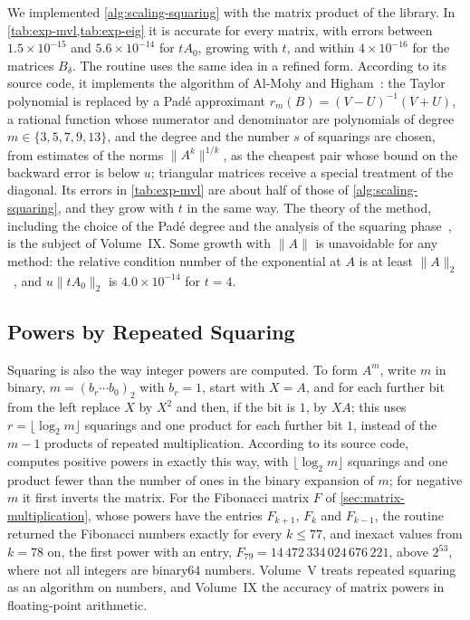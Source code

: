 We implemented \cref{alg:scaling-squaring} with the matrix product of the library. In \cref{tab:exp-mvl,tab:exp-eig} it is accurate for every matrix, with errors between $1.5\times10^{-15}$ and $5.6\times10^{-14}$ for $tA_0$, growing with $t$, and within $4\times10^{-16}$ for the matrices $B_\delta$. The routine  uses the same idea in a refined form. According to its source code, it implements the algorithm of Al-Mohy and Higham~\cite{almohy2009}: the Taylor polynomial is replaced by a Pad\'e approximant $r_m(B)=(V-U)^{-1}(V+U)$, a rational function whose numerator and denominator are polynomials of degree $m\in\{3,5,7,9,13\}$, and the degree and the number $s$ of squarings are chosen, from estimates of the norms $\|A^k\|^{1/k}$, as the cheapest pair whose bound on the backward error is below $u$; triangular matrices receive a special treatment of the diagonal. Its errors in \cref{tab:exp-mvl} are about half of those of \cref{alg:scaling-squaring}, and they grow with $t$ in the same way. The theory of the method, including the choice of the Pad\'e degree and the analysis of the squaring phase~\cite{higham2005}, is the subject of Volume~IX. Some growth with $\|A\|$ is unavoidable for any method: the relative condition number of the exponential at $A$ is at least $\|A\|_2$~\cite[Sect.~10.2]{higham2008}, and $u\|tA_0\|_2$ is $4.0\times10^{-14}$ for $t=4$.

\subsection{Powers by Repeated Squaring}

Squaring is also the way integer powers are computed. To form $A^m$, write $m$ in binary, $m=(b_r\cdots b_0)_2$ with $b_r=1$, start with $X=A$, and for each further bit from the left replace $X$ by $X^2$ and then, if the bit is $1$, by $XA$; this uses $r=\lfloor\log_2m\rfloor$ squarings and one product for each further bit $1$, instead of the $m-1$ products of repeated multiplication. According to its source code,  computes positive powers in exactly this way, with $\lfloor\log_2m\rfloor$ squarings and one product fewer than the number of ones in the binary expansion of $m$; for negative $m$ it first inverts the matrix. For the Fibonacci matrix $F$ of \cref{sec:matrix-multiplication}, whose powers have the entries $F_{k+1}$, $F_k$ and $F_{k-1}$, the routine returned the Fibonacci numbers exactly for every $k\le77$, and inexact values from $k=78$ on, the first power with an entry, $F_{79}=14\,472\,334\,024\,676\,221$, above $2^{53}$, where not all integers are binary64 numbers. Volume~V treats repeated squaring as an algorithm on numbers, and Volume~IX the accuracy of matrix powers in floating-point arithmetic.

